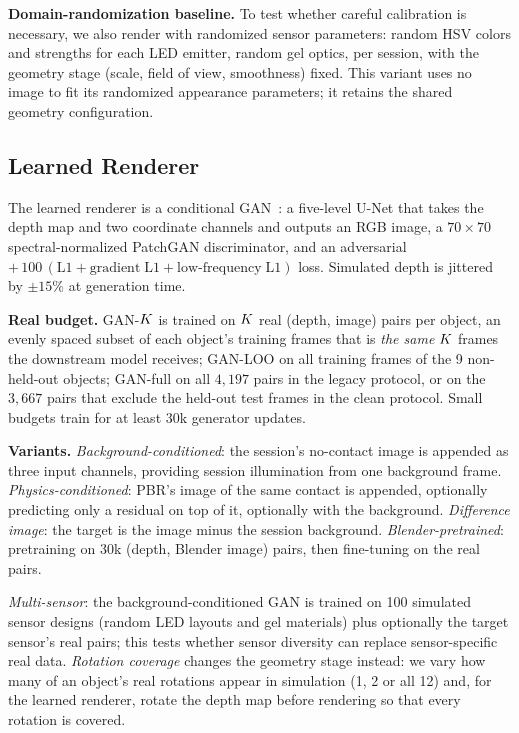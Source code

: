\noindent\textbf{Domain-randomization baseline.} To test whether careful calibration is necessary, we also render with randomized sensor parameters: random HSV colors and strengths for each LED emitter, random gel optics, per session, with the geometry stage (scale, field of view, smoothness) fixed. This variant uses no image to fit its randomized appearance parameters; it retains the shared geometry configuration.

\subsection{Learned Renderer}
\label{sec:gan}
The learned renderer is a conditional GAN~\cite{isola2017pix2pix}: a five-level U-Net that takes the depth map and two coordinate channels and outputs an RGB image, a $70\times70$ spectral-normalized PatchGAN discriminator, and an adversarial $+\,100\,(\mathrm{L1} + \mathrm{gradient\;L1} + \mathrm{low\text{-}frequency\;L1})$ loss. Simulated depth is jittered by $\pm15\%$ at generation time.

\noindent\textbf{Real budget.} GAN-$K$ is trained on $K$ real (depth, image) pairs per object, an evenly spaced subset of each object's training frames that is \emph{the same} $K$ frames the downstream model receives; GAN-LOO on all training frames of the 9 non-held-out objects; GAN-full on all $4{,}197$ pairs in the legacy protocol, or on the $3{,}667$ pairs that exclude the held-out test frames in the clean protocol. Small budgets train for at least $30$k generator updates.

\noindent\textbf{Variants.} \emph{Background-conditioned}: the session's no-contact image is appended as three input channels, providing session illumination from one background frame. \emph{Physics-conditioned}: PBR's image of the same contact is appended, optionally predicting only a residual on top of it, optionally with the background. \emph{Difference image}: the target is the image minus the session background. \emph{Blender-pretrained}: pretraining on $30$k (depth, Blender image) pairs, then fine-tuning on the real pairs.

\emph{Multi-sensor}: the background-conditioned GAN is trained on 100 simulated sensor designs (random LED layouts and gel materials) plus optionally the target sensor's real pairs; this tests whether sensor diversity can replace sensor-specific real data. \emph{Rotation coverage} changes the geometry stage instead: we vary how many of an object's real rotations appear in simulation (1, 2 or all 12) and, for the learned renderer, rotate the depth map before rendering so that every rotation is covered.

